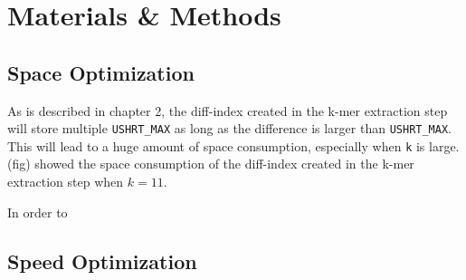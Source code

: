 \chapter{Materials \& Methods}

\section{Space Optimization}

As is described in chapter 2, the diff-index created in the k-mer extraction step will store multiple \texttt{USHRT\_MAX} as long as the difference is larger than \texttt{USHRT\_MAX}. This will lead to a huge amount of space consumption, especially when \texttt{k} is large. (fig) showed the space consumption of the diff-index created in the k-mer extraction step when $k = 11$.

In order to

\section{Speed Optimization}
